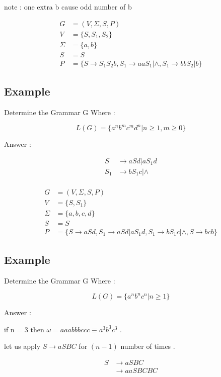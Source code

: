 \documentclass[12pt]{book}
\begin{document}
note : one extra b cause odd number of b

\begin{align*}
G &= (V, \Sigma, S, P) \\
V &= \{ S , S_{1} , S_{2} \} \\
\Sigma &= \{ a, b \} \\
S &= S \\
P &= \{ S \to S_{1}S_{2}b ,
S_{1} \to aaS_{1} | \wedge ,
S_{1} \to bbS_{2} | b \}
\end{align*}


\subsection{Example}

Determine the Grammar G Where :

$$
L(G) = \{ a^{n} b^{m} c^{m} d^{n}  | n \geq 1 , m \geq 0 \}
$$

Answer :

\begin{align*}
 S &\to aSd | aS_{1}d \\
 S_{1} &\to bS_{1}c | \wedge \\
\end{align*}


\begin{align*}
G &= (V, \Sigma, S, P) \\
V &= \{ S , S_{1} \} \\
\Sigma &= \{ a, b, c, d \} \\
S &= S \\
P &= \{ S \to aSd ,
S_{1} \to aSd | aS_{1}d ,
S_{1} \to bS_{1}c | \wedge , 
S \to bcb \}
\end{align*}


\subsection{Example}

Determine the Grammar G Where :

$$
L(G) = \{ a^{n} b^{n} c^{n}  | n \geq 1 \}
$$

Answer :

if n = 3 then $\omega = aaabbbccc \equiv a^{3} b^{3} c^{3}$ .

let us apply $S \to aSBC$ for $(n-1)$ number of times .

\begin{align*}
 S &\to aSBC \\
  &\to aaSBCBC \\
\end{align*}
\end{document}
